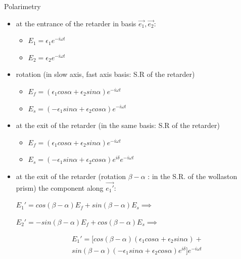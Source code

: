 \documentclass{beamer}
\begin{document}
\begin{frame}{Polarimetry}
\begin{itemize}
\item at the entrance of the retarder in basis $\vec{e_1},\vec{e_2}$:
\begin{itemize}
\item $E_1 = \epsilon_1 e^{-i \omega t}$
\item $E_2 = \epsilon_2 e^{-i \omega t}$

\end{itemize}


\item rotation (in slow axis, fast axis basis: S.R of the retarder)
\begin{itemize}
\item $E_f = (\epsilon_1 cos \alpha + \epsilon_2 sin \alpha) e^{-i \omega t}$
\item $E_s = (-\epsilon_1 sin \alpha + \epsilon_2 cos \alpha) e^{-i \omega t}$
\end{itemize}
\item at the exit of the retarder (in the same basis: S.R of the retarder)
\begin{itemize}
\item $E_f = (\epsilon_1 cos \alpha + \epsilon_2 sin \alpha) e^{-i \omega t}$
\item $E_s = (-\epsilon_1 sin \alpha + \epsilon_2 cos \alpha)e^{i \delta} e^{-i \omega t}$
\end{itemize}
\item at the exit of the retarder (rotation $\beta - \alpha$ : in the S.R. of the wollaston prism)
the component along $\vec{e_1'}$:

$E_1' = cos(\beta - \alpha) E_f + sin(\beta - \alpha) E_s \implies $

$E_2' = -sin(\beta - \alpha) E_f + cos(\beta - \alpha) E_s \implies $


\begin{equation}
\begin{split}
E_1' = [cos(\beta - \alpha) (\epsilon_1 cos \alpha + \epsilon_2 sin \alpha) + \\
sin(\beta - \alpha ) (-\epsilon_1 sin \alpha + \epsilon_2 cos \alpha)e^{i \delta} ] 
e^{-i \omega t}
\end{split}
\end{equation}

\end{itemize}


\end{frame}
\end{document}
